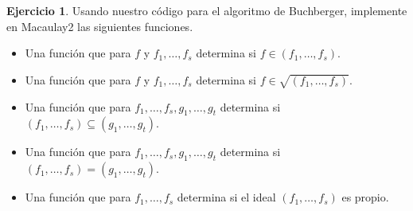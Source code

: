 \documentclass{article}
\theoremstyle{definition}
\newtheorem{ejerc}{Ejercicio}
\begin{document}
\begin{ejerc}
  Usando nuestro código para el algoritmo de Buchberger, implemente en Macaulay2
  las siguientes funciones.

  \begin{itemize}
  \item Una función que para $f$ y $f_1,\ldots,f_s$ determina si
    $f \in (f_1,\ldots,f_s)$.

  \item Una función que para $f$ y $f_1,\ldots,f_s$ determina si
    $f \in \sqrt{(f_1,\ldots,f_s)}$.

  \item Una función que para $f_1,\ldots,f_s, g_1,\ldots,g_t$ determina si
    $(f_1,\ldots,f_s) \subseteq (g_1,\ldots,g_t)$.

  \item Una función que para $f_1,\ldots,f_s, g_1,\ldots,g_t$ determina si
    $(f_1,\ldots,f_s) = (g_1,\ldots,g_t)$.

  \item Una función que para $f_1,\ldots,f_s$ determina si el ideal
    $(f_1,\ldots,f_s)$ es propio.
  \end{itemize}
\end{ejerc}
\end{document}
